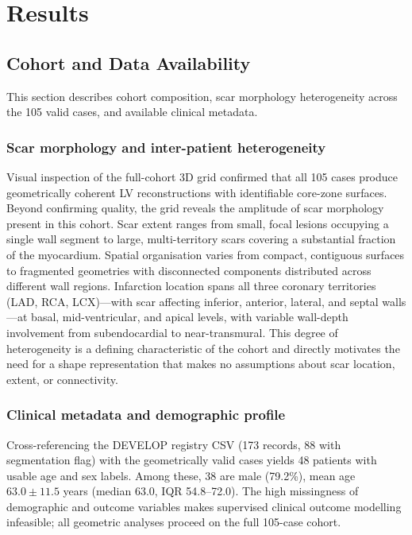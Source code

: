\chapter{Results}
\label{chap:results}

\section{Cohort and Data Availability}

This section describes cohort composition, scar morphology heterogeneity across the
105 valid cases, and available clinical metadata.

\subsection{Scar morphology and inter-patient heterogeneity}
\label{sec:scarmorph}

Visual inspection of the full-cohort 3D grid confirmed that all 105 cases produce
geometrically coherent LV reconstructions with identifiable core-zone surfaces. Beyond
confirming quality, the grid reveals the amplitude of scar morphology present in this cohort.
Scar extent ranges from small, focal lesions occupying a single wall segment to large,
multi-territory scars covering a substantial fraction of the myocardium. Spatial organisation
varies from compact, contiguous surfaces to fragmented geometries with disconnected
components distributed across different wall regions. Infarction location spans all three coronary territories (LAD, RCA, LCX)---with scar
affecting inferior, anterior, lateral, and septal walls---at basal, mid-ventricular, and
apical levels, with variable wall-depth involvement from subendocardial to near-transmural.
This degree of heterogeneity is a defining characteristic of the cohort and directly motivates
the need for a shape representation that makes no assumptions about scar location, extent,
or connectivity.

\subsection{Clinical metadata and demographic profile}

Cross-referencing the DEVELOP registry CSV (173 records, 88 with segmentation flag) with
the geometrically valid cases yields 48 patients with usable age and sex labels. Among
these, 38 are male (79.2\%), mean age $63.0 \pm 11.5$ years (median 63.0, IQR 54.8--72.0).
The high missingness of demographic and outcome variables makes supervised clinical
outcome modelling infeasible; all geometric analyses proceed on the full 105-case cohort.


